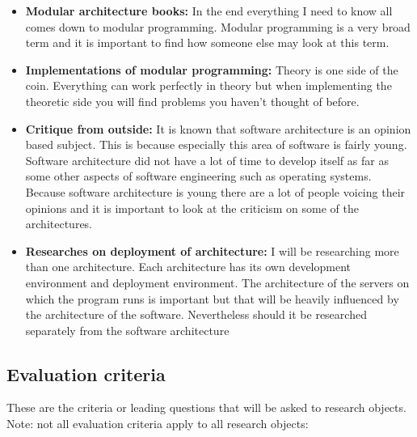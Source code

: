 \documentclass{report}
\begin{document}
\begin{itemize}
	\item \textbf{Modular architecture books: }In the end everything I need to know all comes down to modular programming. Modular programming is a very broad term and it is important to find how someone else may look at this term.
	
	\item \textbf{Implementations of modular programming: }Theory is one side of the coin. Everything can work perfectly in theory but when implementing the theoretic side you will find problems you haven't thought of before.
	
	\item \textbf{Critique from outside: }It is known that software architecture is an opinion based subject. This is because especially this area of software is fairly young. Software architecture did not have a lot of time to develop itself as far as some other aspects of software engineering such as operating systems. Because software architecture is young there are a lot of people voicing their opinions and it is important to look at the criticism on some of the architectures.
	
	\item \textbf{Researches on deployment of architecture: }I will be researching more than one architecture. Each architecture has its own development environment and deployment environment. The architecture of the servers on which the program runs is important but that will be heavily influenced by the architecture of the software. Nevertheless should it be researched separately from the software architecture
\end{itemize}

\subsection{Evaluation criteria}
These are the criteria or leading questions that will be asked to research objects. Note: not all evaluation criteria apply to all research objects:
\end{document}
